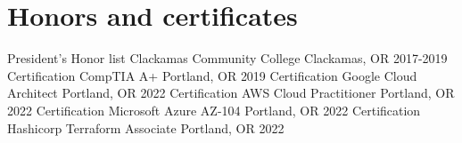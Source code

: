 \section{Honors and certificates}
\begin{cvhonors}

\cvhonor
{President's Honor list} %
{Clackamas Community College} %
{Clackamas, OR} %
{2017-2019} %
\cvhonor
{Certification} %
{CompTIA A+} %
{Portland, OR} %
{2019} %
\cvhonor
{Certification} %
{Google Cloud Architect} %
{Portland, OR} %
{2022} %
\cvhonor
{Certification} %
{AWS Cloud Practitioner} %
{Portland, OR} %
{2022} %
\cvhonor
{Certification} %
{Microsoft Azure AZ-104} %
{Portland, OR} %
{2022} %
\cvhonor
{Certification} %
{Hashicorp Terraform Associate} %
{Portland, OR} %
{2022} %
\end{cvhonors}
